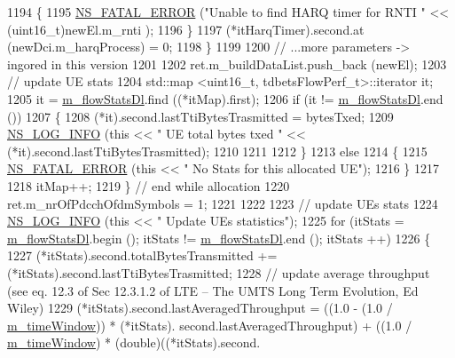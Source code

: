 \begin{DoxyCode}
1194             \{
1195               \hyperlink{group__fatal_ga5131d5e3f75d7d4cbfd706ac456fdc85}{NS\_FATAL\_ERROR} (\textcolor{stringliteral}{"Unable to find HARQ timer for RNTI "} << (uint16\_t)newEl.m\_rnti
      );
1196             \}
1197           (*itHarqTimer).second.at (newDci.m\_harqProcess) = 0;
1198         \}
1199 
1200       \textcolor{comment}{// ...more parameters -> ingored in this version}
1201 
1202       ret.m\_buildDataList.push\_back (newEl);
1203       \textcolor{comment}{// update UE stats}
1204       std::map <uint16\_t, tdbetsFlowPerf\_t>::iterator it;
1205       it = \hyperlink{classns3_1_1TdBetFfMacScheduler_a78d90d229bd176d578a607688cdf69a6}{m\_flowStatsDl}.find ((*itMap).first);
1206       \textcolor{keywordflow}{if} (it != \hyperlink{classns3_1_1TdBetFfMacScheduler_a78d90d229bd176d578a607688cdf69a6}{m\_flowStatsDl}.end ())
1207         \{
1208           (*it).second.lastTtiBytesTrasmitted = bytesTxed;
1209           \hyperlink{group__logging_gafbd73ee2cf9f26b319f49086d8e860fb}{NS\_LOG\_INFO} (\textcolor{keyword}{this} << \textcolor{stringliteral}{" UE total bytes txed "} << (*it).second.lastTtiBytesTrasmitted);
1210 
1211 
1212         \}
1213       \textcolor{keywordflow}{else}
1214         \{
1215           \hyperlink{group__fatal_ga5131d5e3f75d7d4cbfd706ac456fdc85}{NS\_FATAL\_ERROR} (\textcolor{keyword}{this} << \textcolor{stringliteral}{" No Stats for this allocated UE"});
1216         \}
1217 
1218       itMap++;
1219     \} \textcolor{comment}{// end while allocation}
1220   ret.m\_nrOfPdcchOfdmSymbols = 1;   
1221 
1222 
1223   \textcolor{comment}{// update UEs stats}
1224   \hyperlink{group__logging_gafbd73ee2cf9f26b319f49086d8e860fb}{NS\_LOG\_INFO} (\textcolor{keyword}{this} << \textcolor{stringliteral}{" Update UEs statistics"});
1225   \textcolor{keywordflow}{for} (itStats = \hyperlink{classns3_1_1TdBetFfMacScheduler_a78d90d229bd176d578a607688cdf69a6}{m\_flowStatsDl}.begin (); itStats != \hyperlink{classns3_1_1TdBetFfMacScheduler_a78d90d229bd176d578a607688cdf69a6}{m\_flowStatsDl}.end (); itStats
      ++)
1226     \{
1227       (*itStats).second.totalBytesTransmitted += (*itStats).second.lastTtiBytesTrasmitted;
1228       \textcolor{comment}{// update average throughput (see eq. 12.3 of Sec 12.3.1.2 of LTE – The UMTS Long Term Evolution, Ed
       Wiley)}
1229       (*itStats).second.lastAveragedThroughput = ((1.0 - (1.0 / \hyperlink{classns3_1_1TdBetFfMacScheduler_abedd8d532189797f7f33af0e2a49427e}{m\_timeWindow})) * (*itStats).
      second.lastAveragedThroughput) + ((1.0 / \hyperlink{classns3_1_1TdBetFfMacScheduler_abedd8d532189797f7f33af0e2a49427e}{m\_timeWindow}) * (double)((*itStats).second.

\end{DoxyCode}
